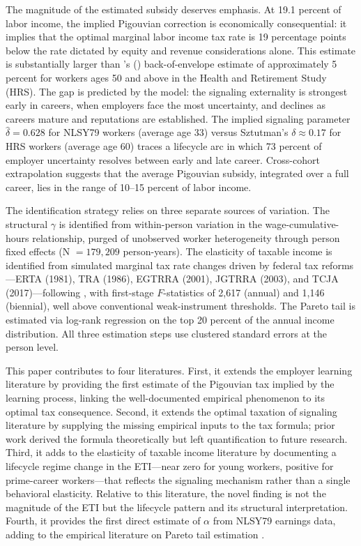 \documentclass[12pt]{article}
\theoremstyle{definition}
\theoremstyle{remark}
\newcommand{\citepos}[1]{\citeauthor{#1}'s (\citeyear{#1})}
\begin{document}
The magnitude of the estimated subsidy deserves emphasis. At 19.1 percent of labor income, the
implied Pigouvian correction is economically consequential: it implies that the optimal marginal
labor income tax rate is 19 percentage points below the rate dictated by equity and revenue
considerations alone. This estimate is substantially larger than \citepos{sztutman2024}
back-of-envelope estimate of approximately 5 percent for workers ages 50 and above in the
Health and Retirement Study (HRS). The gap is predicted by the model: the signaling
externality is strongest early in careers, when employers face the most uncertainty, and
declines as careers mature and reputations are established. The implied signaling parameter
$\hat{\delta} = 0.628$ for NLSY79 workers (average age 33) versus Sztutman's $\delta \approx 0.17$
for HRS workers (average age 60) traces a lifecycle arc in which 73 percent of employer
uncertainty resolves between early and late career. Cross-cohort extrapolation suggests that
the average Pigouvian subsidy, integrated over a full career, lies in the range of 10--15
percent of labor income.

The identification strategy relies on three separate sources of variation. The structural
$\gamma$ is identified from within-person variation in the wage-cumulative-hours relationship,
purged of unobserved worker heterogeneity through person fixed effects (N $= 179{,}209$
person-years). The elasticity of taxable income is identified from simulated marginal tax rate
changes driven by federal tax reforms---ERTA (1981), TRA (1986), EGTRRA (2001), JGTRRA (2003),
and TCJA (2017)---following \citet{gruber2002elasticity}, with first-stage $F$-statistics of
2,617 (annual) and 1,146 (biennial), well above conventional weak-instrument thresholds. The
Pareto tail is estimated via log-rank regression on the top 20 percent of the annual income
distribution. All three estimation steps use clustered standard errors at the person level.

This paper contributes to four literatures. First, it extends the employer learning literature
\citep{farber1996learning, altonji2001employer, gibbons1999careers, lange2007speed} by providing
the first estimate of the Pigouvian tax implied by the learning process, linking the
well-documented empirical phenomenon to its optimal tax consequence. Second, it extends the
optimal taxation of signaling literature \citep{boskin1975taxation, stiglitz1982self,
sztutman2024} by supplying the missing empirical inputs to the tax formula; prior work derived
the formula theoretically but left quantification to future research. Third, it adds to the
elasticity of taxable income literature \citep{feldstein1995effect, gruber2002elasticity,
kopczuk2005tax, saez2012elasticity} by documenting a lifecycle regime change in the ETI—near
zero for young workers, positive for prime-career workers—that reflects the signaling mechanism
rather than a single behavioral elasticity. Relative to this literature, the novel finding is
not the magnitude of the ETI but the lifecycle pattern and its structural interpretation.
Fourth, it provides the first direct estimate of $\alpha$ from NLSY79 earnings data, adding to
the empirical literature on Pareto tail estimation \citep{saez2001using, diamond1998optimal}.
\end{document}
